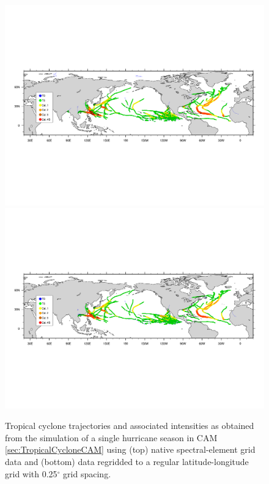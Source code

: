 \documentclass[gmdd, hvmath, online]{copernicus_discussions}
\begin{document}
\begin{figure}[H]
\begin{center}
\includegraphics[clip, trim=0.2cm 6.6cm 0.2cm 7.1cm, width=5in]{nhemi-traj_plotted.pdf}
\includegraphics[clip, trim=0.2cm 6.8cm 0.2cm 7.1cm, width=5in]{nhemi_regrid-traj_plotted.pdf}
\end{center}
\caption{Tropical cyclone trajectories and associated intensities as obtained from the simulation of a single hurricane season in CAM \ref{sec:TropicalCycloneCAM} using (top) native spectral-element grid data and (bottom) data regridded to a regular latitude-longitude grid with 0.25$^\circ$ grid spacing.} \label{fig:TropicalCycloneCAM}
\end{figure}
\end{document}

